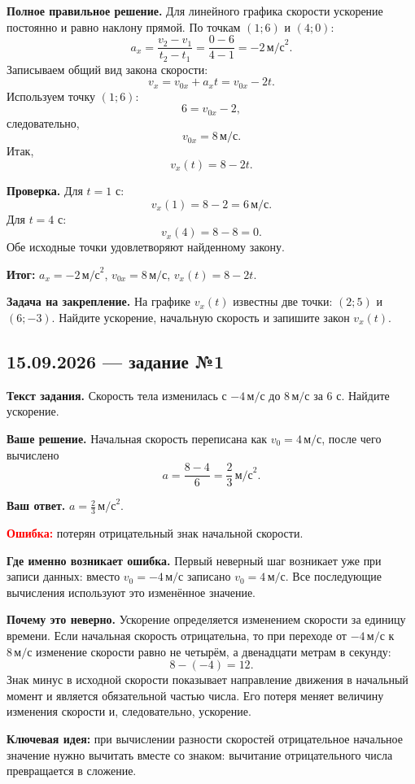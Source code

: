 \documentclass[12pt,a4paper]{article}
\newcommand{\taskhead}[1]{\subsection*{#1}}
\newcommand{\field}[1]{\textbf{#1}}
\begin{document}
\field{Полное правильное решение.} Для линейного графика скорости ускорение постоянно и равно наклону прямой. По точкам $(1;6)$ и $(4;0)$:
\[
a_x=\frac{v_2-v_1}{t_2-t_1}=\frac{0-6}{4-1}=-2\,\text{м/с}^2.
\]
Записываем общий вид закона скорости:
\[
v_x=v_{0x}+a_xt=v_{0x}-2t.
\]
Используем точку $(1;6)$:
\[
6=v_{0x}-2,
\]
следовательно,
\[
v_{0x}=8\,\text{м/с}.
\]
Итак,
\[
v_x(t)=8-2t.
\]

\field{Проверка.} Для $t=1$ с:
\[
v_x(1)=8-2=6\,\text{м/с}.
\]
Для $t=4$ с:
\[
v_x(4)=8-8=0.
\]
Обе исходные точки удовлетворяют найденному закону.

\textcolor{teal!60!black}{\textbf{Итог:}} $a_x=-2\,\text{м/с}^2$, $v_{0x}=8\,\text{м/с}$, $v_x(t)=8-2t$.

\field{Задача на закрепление.} На графике $v_x(t)$ известны две точки: $(2;5)$ и $(6;-3)$. Найдите ускорение, начальную скорость и запишите закон $v_x(t)$.

\newpage
{}\label{task:15-1}
\taskhead{15.09.2026 --- задание №1}

\field{Текст задания.} Скорость тела изменилась с $-4\,\text{м/с}$ до $8\,\text{м/с}$ за $6$ с. Найдите ускорение.

\field{Ваше решение.} Начальная скорость переписана как $v_0=4\,\text{м/с}$, после чего вычислено
\[
a=\frac{8-4}{6}=\frac{2}{3}\,\text{м/с}^2.
\]

\field{Ваш ответ.} $a=\frac{2}{3}\,\text{м/с}^2$.

\textcolor{red}{\textbf{Ошибка:}} потерян отрицательный знак начальной скорости.

\field{Где именно возникает ошибка.} Первый неверный шаг возникает уже при записи данных: вместо $v_0=-4\,\text{м/с}$ записано $v_0=4\,\text{м/с}$. Все последующие вычисления используют это изменённое значение.

\field{Почему это неверно.} Ускорение определяется изменением скорости за единицу времени. Если начальная скорость отрицательна, то при переходе от $-4\,\text{м/с}$ к $8\,\text{м/с}$ изменение скорости равно не четырём, а двенадцати метрам в секунду:
\[
8-(-4)=12.
\]
Знак минус в исходной скорости показывает направление движения в начальный момент и является обязательной частью числа. Его потеря меняет величину изменения скорости и, следовательно, ускорение.

\textcolor{blue!60!black}{\textbf{Ключевая идея:}} при вычислении разности скоростей отрицательное начальное значение нужно вычитать вместе со знаком: вычитание отрицательного числа превращается в сложение.
\end{document}
